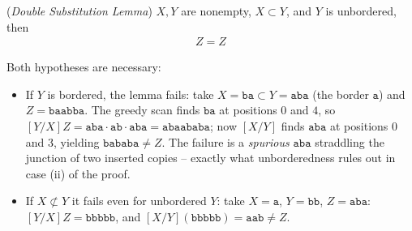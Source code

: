 \documentclass[runningheads,envcountsect]{llncs}
\renewenvironment{remark}
  {\rmfamily\trivlist\item[\hskip\labelsep{\itshape Remark.}]\ignorespaces}
  {\endtrivlist}
\begin{document}
\begin{lemma}
    (\emph{Double Substitution Lemma})
    $X,Y$ are nonempty, $X\subset Y$, and $Y$ is unbordered, then
    \begin{align}
        [X/Y][Y/X]Z=Z
    \end{align}
    \label{lem:double substitution}
\end{lemma}

\begin{remark}
    Both hypotheses are necessary:
    \begin{itemize}
        \item If $Y$ is bordered, the lemma fails: take $X=\mathtt{ba}\subset Y=\mathtt{aba}$ (the border $\mathtt{a}$) and $Z=\mathtt{baabba}$. The greedy scan finds $\mathtt{ba}$ at positions $0$ and $4$, so $[Y/X]Z = \mathtt{aba}\cdot\mathtt{ab}\cdot\mathtt{aba} = \mathtt{abaababa}$; now $[X/Y]$ finds $\mathtt{aba}$ at positions $0$ and $3$, yielding $\mathtt{bababa} \neq Z$. The failure is a \emph{spurious} $\mathtt{aba}$ straddling the junction of two inserted copies -- exactly what unborderedness rules out in case (ii) of the proof.
        \item If $X \not\subset Y$ it fails even for unbordered $Y$: take $X=\mathtt{a}$, $Y=\mathtt{bb}$, $Z=\mathtt{aba}$: $[Y/X]Z = \mathtt{bbbbb}$, and $[X/Y](\mathtt{bbbbb}) = \mathtt{aab} \neq Z$.
    \end{itemize}
\end{remark}
\end{document}
